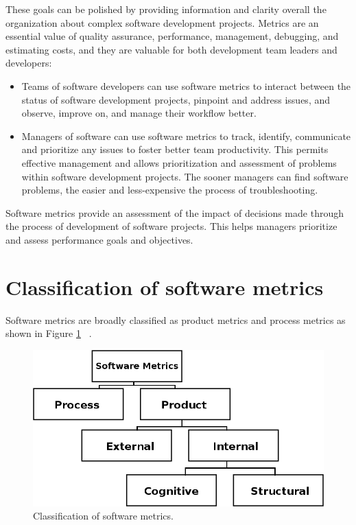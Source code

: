 These goals can be polished by providing information and clarity overall the organization about complex software development projects. Metrics are an essential value of quality assurance, performance, management, debugging, and estimating costs, and they are valuable for both development team leaders and developers:

\begin{itemize}
	\item Teams of software developers can use software metrics to interact between the status of
	software development projects, pinpoint and address issues, and observe, improve on,
	and manage their workflow better.
	\item Managers of software can use software metrics to track, identify, communicate and prioritize any
	issues to foster better team productivity. This permits effective management and allows
	prioritization and assessment of problems within software development projects. The
	sooner managers can find software problems, the easier and less-expensive the process of troubleshooting.
\end{itemize}

Software metrics provide an assessment of the impact of decisions made through the process of development of software projects. This helps managers prioritize and assess performance goals and objectives.

\section{Classification of software metrics}

Software metrics are broadly classified as product metrics and process metrics as shown in Figure \ref{fig:classification} ~\cite{metrics2}.
\begin{figure}[ht]
	\centering
	\includegraphics[width=\textwidth]{figures/classification.png}
	\caption{Classification of software metrics.}
	\label{fig:classification}
\end{figure}

